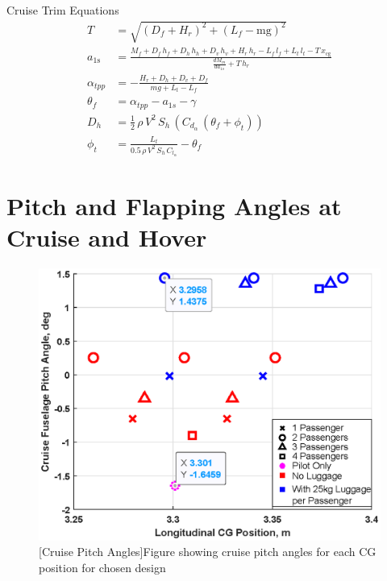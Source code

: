 \documentclass[11pt,a4paper]{article}
\begin{document}
\begin{appendices}
Cruise Trim Equations
\begin{align}
    T&=\sqrt{{\left(D_{f}+H_{r}\right)}^2+{\left(L_{f}-\mathrm{mg}\right)}^2}\\
    a_{\mathrm{1s}}&=\frac{M_{f}+D_{f}\,h_{f}+D_{h}\,h_{h}+D_{v}\,h_{v}+H_{r}\,h_{r}-L_{f}\,l_{f}+L_{t}\,l_{t}-T\,x_{\mathrm{cg}}}{\frac{dM_m}{da_{1s}}+T\,h_{r}}\\
    \alpha_{tpp}&=-\frac{H_r+D_h+D_v+D_f}{mg+L_t-L_f}\\
    \theta_f&=\alpha_{tpp}-a_{1s}-\gamma\\
    D_h&=\frac{1}{2}\,\rho\,V^2\,S_h\,(C_{d_\alpha}\,(\theta_f+\phi_t))\\
    \phi_t&=\frac{L_t}{0.5\,\rho\,V^2\,S_h\,C_{l_\alpha}}-\theta_f
\end{align}{}
%
%
\section{Pitch and Flapping Angles at Cruise and Hover}
\renewcommand\thefigure{D.\arabic{figure}}  
\setcounter{figure}{0}
\renewcommand\theequation{D.\arabic{equation}}  
\setcounter{equation}{0}
\renewcommand\thetable{D.\arabic{table}}  
\setcounter{table}{0}
\begin{figure}[H]
\centering
\begin{minipage}{.49\textwidth}
  \centering
  \includegraphics[width=\linewidth]{CGCRUISEP.eps}
  [Cruise Pitch Angles]{Figure showing cruise pitch angles for each CG position for chosen design}
  \label{fig:CGCRUISEP}

\end{minipage}
\end{figure}
\end{appendices}
\end{document}
